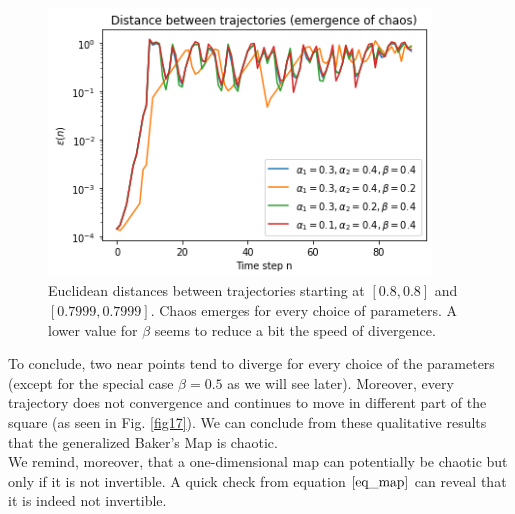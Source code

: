 \documentclass[11pt,titlepage]{article}
\begin{document}
\begin{center}
	\begin{figure} [h]
		\centering
		\includegraphics[width = 4in]{./figures/ex3_1_3.png}
		\caption{Euclidean distances between trajectories starting at $[0.8,0.8]$ and $[0.7999, 0.7999]$. Chaos emerges for every choice of parameters. A lower value for $\beta$ seems to reduce a bit the speed of divergence.}
		\label{fig18}
	\end{figure}
\end{center}
To conclude, two near points tend to diverge for every choice of the parameters (except for the special case $\beta=0.5$ as we will see later). Moreover, every trajectory does not convergence and continues to move in different part of the square (as seen in Fig. \ref{fig17}). We can conclude from these qualitative results that the generalized Baker's Map is chaotic. \\
We remind, moreover, that a one-dimensional map can potentially be chaotic but only if it is not invertible. A quick check from equation $\ref{eq_map}$ can reveal that it is indeed not invertible.
\end{document}

